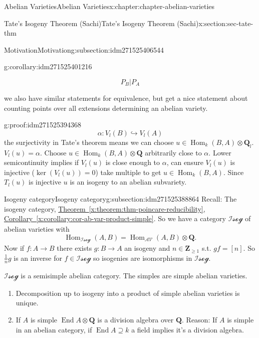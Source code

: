 \documentclass[oneside,10pt,]{book}
\numberwithin{equation}{section}
\newcommand{\lb}{[}
\newcommand{\rb}{]}
\newcommand{\ZZ}{\mathbf{Z}}
\newcommand{\QQ}{\mathbf{Q}}
\newcommand{\cat}[1]{\mathcal{#1}}
\DeclareMathOperator{\End}{End}
\DeclareMathOperator{\Hom}{Hom}
\begin{document}
\begin{chapterptx}{Abelian Varieties}{}{Abelian Varieties}{}{}{x:chapter:chapter-abelian-varieties}
\begin{sectionptx}{Tate's Isogeny Theorem (Sachi)}{}{Tate's Isogeny Theorem (Sachi)}{}{}{x:section:sec-tate-thm}
\begin{subsectionptx}{Motivation}{}{Motivation}{}{}{g:subsection:idm271525406544}
\begin{corollary}{}{}{g:corollary:idm271525401216}
\begin{enumerate}
\begin{enumerate}
\begin{equation*}
P_B | P_A
\end{equation*}
%
\end{enumerate}
%
\end{enumerate}
we also have similar statements for equivalence, but get a nice statement about counting points over all extensions determining an abelian variety.%
\end{corollary}
\begin{proofptx}{}{g:proof:idm271525394368}
%
\begin{equation*}
\alpha \colon V_l(B)\hookrightarrow V_l(A)
\end{equation*}
the surjectivity in Tate's theorem means we can choose \(u \in \Hom_k(B,A) \otimes \QQ_l\). \(V_l(u) = \alpha\). Choose \(u \in \Hom_k(B,A) \otimes \QQ\) arbitrarily close to \(\alpha\). Lower semicontinuity implies if \(V_l(u)\) is close enough to \(\alpha\), can ensure \(V_l(u)\) is injective (\(\ker (V_l (u)) = 0\)) take multiple to get \(u \in \Hom_k(B,A)\). Since \(T_l (u)\) is injective \(u \) is an isogeny to an abelian subvariety.%
\end{proofptx}
\end{subsectionptx}
%
%
\typeout{************************************************}
\typeout{************************************************}
%
\begin{subsectionptx}{Isogeny category}{}{Isogeny category}{}{}{g:subsection:idm271525388864}
Recall: The isogeny category, \hyperref[x:theorem:thm-poincare-reducibility]{Theorem~\ref{x:theorem:thm-poincare-reducibility}}, \hyperref[x:corollary:cor-ab-var-product-simple]{Corollary~\ref{x:corollary:cor-ab-var-product-simple}}. So we have  a category \(\cat{Isog}\) of abelian varieties with%
\begin{equation*}
\Hom_{\cat{Isog}}(A,B) = \Hom_\cat{AV}(A,B)\otimes \QQ\text{.}
\end{equation*}
Now if \(f \colon A \to B\) there exists \(g\colon B \to A\) an isogeny and \(n\in \ZZ_{\ge 1}\) s.t. \(gf = \lb n \rb\). So \(\frac 1n g\) is an inverse for \(f \in \cat{Isog}\) so isogenies are isomorphisms in \(\cat{Isog}\).%
\par
\(\cat{Isog}\) is a semisimple abelian category. The simples are simple abelian varieties.%
\begin{enumerate}
\item{}Decomposition up to isogeny into a product of simple abelian varieties is unique.%
\item{}If \(A\) is simple \(\End A \otimes \QQ\) is a division algebra over \(\QQ\). Reason: If \(A\) is simple in an abelian category, if \(\End A \supseteq k\) a field implies it's a division algebra.%

\end{enumerate}
\end{subsectionptx}
\end{sectionptx}
\end{chapterptx}
\end{document}
